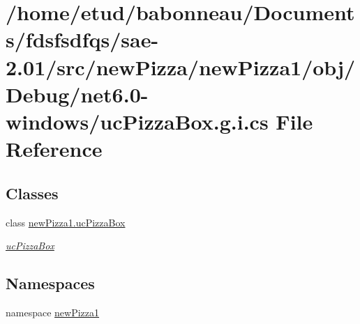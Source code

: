 \hypertarget{net6_80-windows_2ucPizzaBox_8g_8i_8cs}{}\section{/home/etud/babonneau/\+Documents/fdsfsdfqs/sae-\/2.01/src/new\+Pizza/new\+Pizza1/obj/\+Debug/net6.0-\/windows/uc\+Pizza\+Box.g.\+i.\+cs File Reference}
\label{net6_80-windows_2ucPizzaBox_8g_8i_8cs}
\subsection*{Classes}
\begin{DoxyCompactItemize}
\item 
class \hyperlink{classnewPizza1_1_1ucPizzaBox}{new\+Pizza1.\+uc\+Pizza\+Box}
\begin{DoxyCompactList}\small\item\em \hyperlink{classnewPizza1_1_1ucPizzaBox}{uc\+Pizza\+Box} \end{DoxyCompactList}\end{DoxyCompactItemize}
\subsection*{Namespaces}
\begin{DoxyCompactItemize}
\item 
namespace \hyperlink{namespacenewPizza1}{new\+Pizza1}
\end{DoxyCompactItemize}
